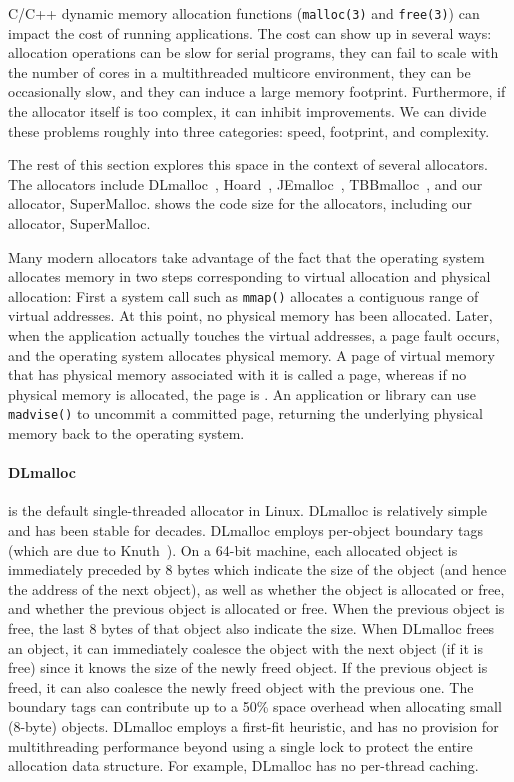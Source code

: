 \documentclass{sigplanconf}
\newcommand{\code}[1]{\texttt{#1}}
\begin{document}
              


C/C++ dynamic memory allocation functions (\code{malloc(3)} and
\code{free(3)}) can impact the cost of running applications.  The cost
can show up in several ways: allocation operations can be slow for
serial programs, they can fail to scale with the number of cores in a
multithreaded multicore environment, they can be occasionally slow,
and they can induce a large memory footprint.  Furthermore, if the
allocator itself is too complex, it can inhibit improvements.  We can
divide these problems roughly into three categories: speed, footprint,
and complexity. 

The rest of this section explores this space in the context of several
allocators.  The allocators include DLmalloc~\cite{Lea96},
Hoard~\cite{BergerMcBl00}, JEmalloc~\cite{Evans06},
TBBmalloc~\cite{KukanovVo07}, and our allocator, SuperMalloc.
 shows the code size for the allocators, including
our allocator, SuperMalloc.

Many modern allocators take advantage of the fact that the operating
system allocates memory in two steps corresponding to virtual
allocation and physical allocation: First a system call such as
\code{mmap()} allocates a contiguous range of virtual addresses.  At
this point, no physical memory has been allocated.  Later, when the
application actually touches the virtual addresses, a page fault
occurs, and the operating system allocates physical memory.  A page of
virtual memory that has physical memory associated with it is called a
 page, whereas if no physical memory is allocated, the
page is .  An application or library can use
\code{madvise()} to uncommit a committed page, returning the
underlying physical memory back to the operating system.

{\paragraph{DLmalloc}} \cite{Lea96} is the default single-threaded
allocator in Linux.  DLmalloc is relatively simple and has been stable
for decades.  DLmalloc employs per-object boundary tags (which are due
to Knuth~\cite{Knuth73}).  On a 64-bit machine, each allocated object
is immediately preceded by 8 bytes which indicate the size of the
object (and hence the address of the next object), as well as whether
the object is allocated or free, and whether the previous object is
allocated or free.  When the previous object is free, the last 8 bytes
of that object also indicate the size.  When DLmalloc frees an object,
it can immediately coalesce the object with the next object (if it is
free) since it knows the size of the newly freed object.  If the
previous object is freed, it can also coalesce the newly freed object
with the previous one.  The boundary tags can contribute up to a 50\%
space overhead when allocating small (8-byte) objects.  DLmalloc
employs a first-fit heuristic, and has no provision for multithreading
performance beyond using a single lock to protect the entire
allocation data structure.  For example, DLmalloc has no per-thread
caching.
\end{document}
